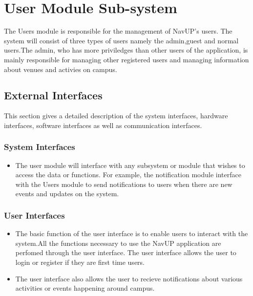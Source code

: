 

\section{User Module Sub-system}

The Users module is responsible for the management of NavUP's users. The system will consist of three types of users namely the admin,guest and normal users.The admin, who has more priviledges than other users of the application, is mainly responsible for managing other registered users and managing information about venues and activies on campus.

\subsection{External Interfaces}
This section gives a detailed description of the system interfaces, hardware interfaces, software interfaces as well as communication interfaces.

	\subsubsection{System Interfaces}
		\begin{itemize}
			\item The user module will interface with any subsystem or module that wishes to access the data or               functions. For example, the notification module interface with the Users module to send notifications to users when there are new events and updates on the system.
		
		\end{itemize}
	\subsubsection{User Interfaces }
	\begin{itemize}
	\item The basic function of the user interface is to enable users to interact with the system.All the functions necessary to use the NavUP application are perfomed through the user interface. The user interface allows the user to login or register if they are first time users. 
\item The user interface also allows the user to recieve notifications about various activities or events happening around campus. 

	\end{itemize}
 
